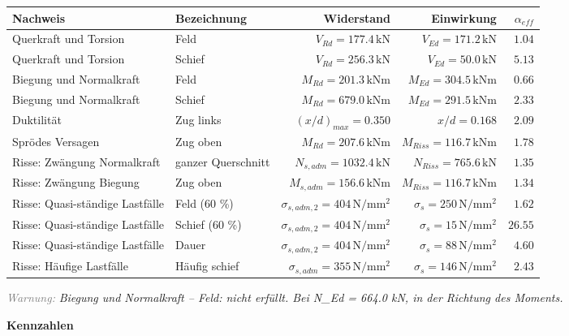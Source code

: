 \documentclass[11pt,a4paper]{article}
\newcommand{\hinweis}[2]{\par\noindent\textcolor{gray}{\textit{#1:}} \textit{#2}\par}
\begin{document}
\begin{xltabular}{\linewidth}{>{\raggedright\arraybackslash}X>{\raggedright\arraybackslash}Xrrr}
\hline
Nachweis & Bezeichnung & Widerstand & Einwirkung & $\alpha_{eff}$ \\
\hline
\endhead
Querkraft und Torsion & Feld & $V_{Rd} = 177.4\,\mathrm{kN}$ & $V_{Ed} = 171.2\,\mathrm{kN}$ & $1.04$ \\
Querkraft und Torsion & Schief & $V_{Rd} = 256.3\,\mathrm{kN}$ & $V_{Ed} = 50.0\,\mathrm{kN}$ & $5.13$ \\
Biegung und Normalkraft & Feld & $M_{Rd} = 201.3\,\mathrm{kNm}$ & $M_{Ed} = 304.5\,\mathrm{kNm}$ & $0.66$ \\
Biegung und Normalkraft & Schief & $M_{Rd} = 679.0\,\mathrm{kNm}$ & $M_{Ed} = 291.5\,\mathrm{kNm}$ & $2.33$ \\
Duktilität & Zug links & $\left(x/d\right)_{max} = 0.350$ & $x/d = 0.168$ & $2.09$ \\
Sprödes Versagen & Zug oben & $M_{Rd} = 207.6\,\mathrm{kNm}$ & $M_{Riss} = 116.7\,\mathrm{kNm}$ & $1.78$ \\
Risse: Zwängung Normalkraft & ganzer Querschnitt & $N_{s,adm} = 1032.4\,\mathrm{kN}$ & $N_{Riss} = 765.6\,\mathrm{kN}$ & $1.35$ \\
Risse: Zwängung Biegung & Zug oben & $M_{s,adm} = 156.6\,\mathrm{kNm}$ & $M_{Riss} = 116.7\,\mathrm{kNm}$ & $1.34$ \\
Risse: Quasi-ständige Lastfälle & Feld (60 \%) & $\sigma_{s,adm,2} = 404\,\mathrm{N}/\mathrm{mm}^{2}$ & $\sigma_s = 250\,\mathrm{N}/\mathrm{mm}^{2}$ & $1.62$ \\
Risse: Quasi-ständige Lastfälle & Schief (60 \%) & $\sigma_{s,adm,2} = 404\,\mathrm{N}/\mathrm{mm}^{2}$ & $\sigma_s = 15\,\mathrm{N}/\mathrm{mm}^{2}$ & $26.55$ \\
Risse: Quasi-ständige Lastfälle & Dauer & $\sigma_{s,adm,2} = 404\,\mathrm{N}/\mathrm{mm}^{2}$ & $\sigma_s = 88\,\mathrm{N}/\mathrm{mm}^{2}$ & $4.60$ \\
Risse: Häufige Lastfälle & Häufig schief & $\sigma_{s,adm} = 355\,\mathrm{N}/\mathrm{mm}^{2}$ & $\sigma_s = 146\,\mathrm{N}/\mathrm{mm}^{2}$ & $2.43$ \\
\hline
\end{xltabular}
\hinweis{Warnung}{Biegung und Normalkraft – Feld: nicht erfüllt. Bei N\_Ed = 664.0 kN, in der Richtung des Moments.}
\noindent\textbf{Kennzahlen}
\end{document}
